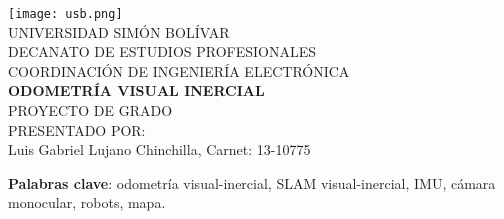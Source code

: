 \begin{titlepage}
    \begin{center}

        \texttt{[image: usb.png]} \\
        \textsc {\large UNIVERSIDAD SIMÓN BOLÍVAR} \\
        \textsc{DECANATO DE ESTUDIOS PROFESIONALES\\
        COORDINACIÓN DE INGENIERÍA ELECTRÓNICA}\\
        \textbf{ODOMETRÍA VISUAL INERCIAL} \\
        PROYECTO DE GRADO \\
        PRESENTADO POR: \\
        Luis Gabriel Lujano Chinchilla, Carnet: 13-10775

    \end{center}
\abstract
{
   
    
}

\noindent \begin{small} \textbf{Palabras clave}: odometría visual-inercial, SLAM visual-inercial, IMU, cámara monocular, robots, mapa. 
\end{small}
	
\clearpage
{}

\end{titlepage}
